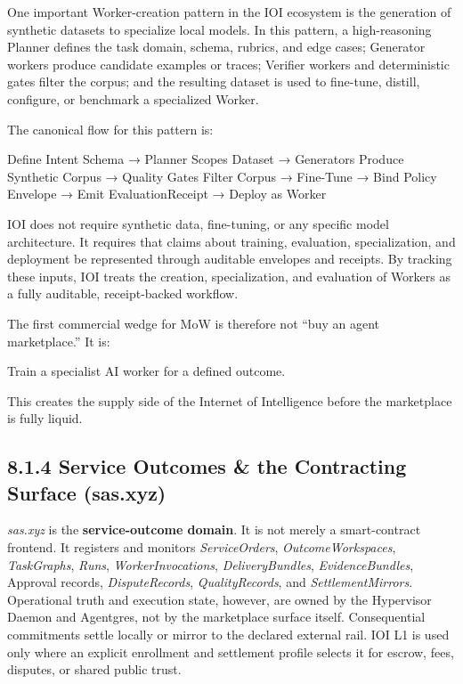 \documentclass[
  11pt,
]{article}
\begin{document}
One important Worker-creation pattern in the IOI ecosystem is the
generation of synthetic datasets to specialize local models. In this
pattern, a high-reasoning Planner defines the task domain, schema,
rubrics, and edge cases; Generator workers produce candidate examples or
traces; Verifier workers and deterministic gates filter the corpus; and
the resulting dataset is used to fine-tune, distill, configure, or
benchmark a specialized Worker.

The canonical flow for this pattern is:

Define Intent Schema → Planner Scopes Dataset → Generators Produce
Synthetic Corpus → Quality Gates Filter Corpus → Fine-Tune → Bind Policy
Envelope → Emit EvaluationReceipt → Deploy as Worker

IOI does not require synthetic data, fine-tuning, or any specific model
architecture. It requires that claims about training, evaluation,
specialization, and deployment be represented through auditable
envelopes and receipts. By tracking these inputs, IOI treats the
creation, specialization, and evaluation of Workers as a fully
auditable, receipt-backed workflow.

The first commercial wedge for MoW is therefore not ``buy an agent
marketplace.'' It is:

Train a specialist AI worker for a defined outcome.

This creates the supply side of the Internet of Intelligence before the
marketplace is fully liquid.

\hypertarget{service-outcomes-the-contracting-surface-sas.xyz}{%
\subsection{8.1.4 Service Outcomes \& the Contracting Surface
(sas.xyz)}\label{service-outcomes-the-contracting-surface-sas.xyz}}

\emph{sas.xyz} is the \textbf{service-outcome domain}. It is not merely
a smart-contract frontend. It registers and monitors
\emph{ServiceOrders}, \emph{OutcomeWorkspaces}, \emph{TaskGraphs},
\emph{Runs}, \emph{WorkerInvocations}, \emph{DeliveryBundles},
\emph{EvidenceBundles}, Approval records, \emph{DisputeRecords},
\emph{QualityRecords}, and \emph{SettlementMirrors}. Operational truth
and execution state, however, are owned by the Hypervisor Daemon and
Agentgres, not by the marketplace surface itself. Consequential
commitments settle locally or mirror to the declared external rail. IOI L1 is
used only where an explicit enrollment and settlement profile selects it for
escrow, fees, disputes, or shared public trust.
\end{document}

